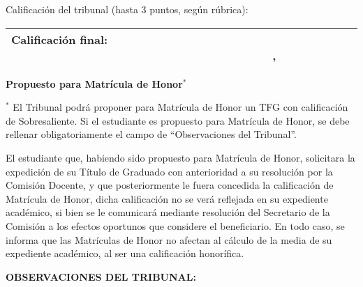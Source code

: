 \begin{description}
  \item[Calificación del tribunal (hasta 3 puntos, según rúbrica):] \myTribunalGrade{}
\end{description}


\begin{table}[ht]
  \centering
  \begin{tabularx}{\textwidth}{|X|}
    \hline
    \vspace{-1mm}
    \textbf{Calificación final:}\newline
    \indent ~~~~~~~~~~~~~~~~~~~~~~~~~~~~~~~~~~~~~~~~   \myFinalGrade{}, \myFinalGradeName{}
    \vspace{1mm} \\ \hline
  \end{tabularx}
\end{table}

\noindent\textbf{Propuesto para Matrícula de Honor}$\mathbf{^{*}}$ ~~~~~~~~ \MHProposalBoxes{}

\noindent$^{*}$ El Tribunal podrá proponer para Matrícula de Honor un TFG con calificación de Sobresaliente. Si el estudiante es propuesto para Matrícula de Honor, se debe rellenar obligatoriamente el campo de ``Observaciones del Tribunal''.

\noindent El estudiante que, habiendo sido propuesto para Matrícula de Honor, solicitara la expedición de su Título de Graduado con anterioridad a su resolución por la Comisión Docente, y que posteriormente le fuera concedida la calificación de Matrícula de Honor, dicha calificación no se verá reflejada en su expediente académico, si bien se le comunicará mediante resolución del Secretario de la Comisión a los efectos oportunos que considere el beneficiario. En todo caso, se informa que las Matrículas de Honor no afectan al cálculo de la media de su expediente académico, al ser una calificación honorífica.

\newpage

\thispagestyle{empty} %


\vspace*{-.8in} %

\noindent\textbf{OBSERVACIONES DEL TRIBUNAL:}

\newpage







